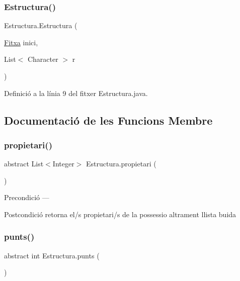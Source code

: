 \subsubsection{\texorpdfstring{Estructura()}{Estructura()}}
{\footnotesize\ttfamily Estructura.\+Estructura (\begin{DoxyParamCaption}\item[{\mbox{\hyperlink{class_fitxa}{Fitxa}}}]{inici,  }\item[{List$<$ Character $>$}]{r }\end{DoxyParamCaption})}



Definició a la línia 9 del fitxer Estructura.\+java.



\subsection{Documentació de les Funcions Membre}
\mbox{\label{class_estructura_a5b6bda815f1395bcec964582050a13b8}} 
\subsubsection{\texorpdfstring{propietari()}{propietari()}}
{\footnotesize\ttfamily abstract List$<$Integer$>$ Estructura.\+propietari (\begin{DoxyParamCaption}{ }\end{DoxyParamCaption})\hspace{0.3cm}{\ttfamily [abstract]}}

\begin{DoxyPrecond}{Precondició}
--- 
\end{DoxyPrecond}
\begin{DoxyPostcond}{Postcondició}
retorna el/s propietari/s de la possessio altrament llista buida 
\end{DoxyPostcond}
\mbox{\label{class_estructura_a0cfa7e48f733d9dd7852a188b8be9c3c}} 
\subsubsection{\texorpdfstring{punts()}{punts()}}
{\footnotesize\ttfamily abstract int Estructura.\+punts (\begin{DoxyParamCaption}{ }\end{DoxyParamCaption})\hspace{0.3cm}{\ttfamily [abstract]}}

